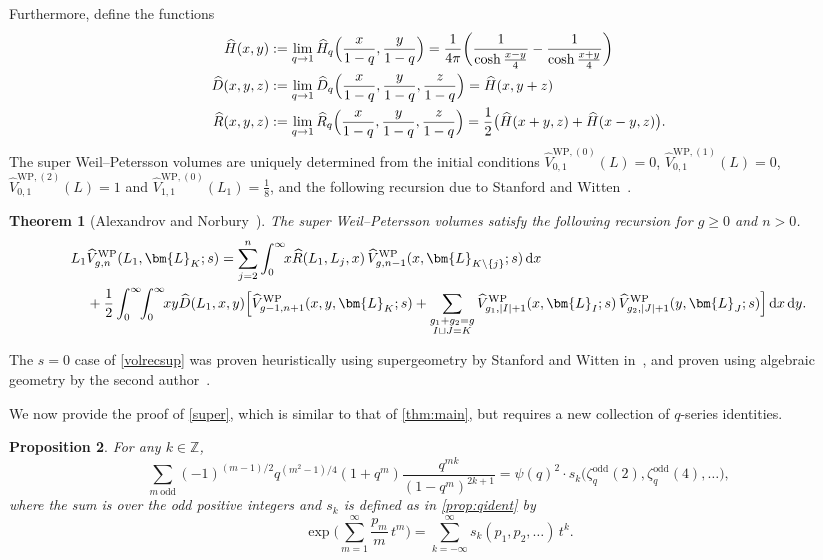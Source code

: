 \documentclass[a4paper]{article}
\theoremstyle{plain}
\newtheorem{theorem}{Theorem}
\newtheorem{proposition}[theorem]{Proposition}
\theoremstyle{definition}
\newcommand{\dd}{\mathrm{d}}
\renewcommand{\geq}{\geqslant}
\newcommand{\LL}{\bm{L}}
\newcommand{\bz}{\mathbb{Z}}
\begin{document}
Furthermore, define the functions
\begin{align} \label{qkerlimsup}
\widehat{H}(x,y)&:= \lim_{q\to 1} \widehat{H}_q \Big( \frac{x}{1-q}, \frac{y}{1-q} \Big) = \frac{1}{4\pi} \bigg( \frac{1}{\cosh\frac{x-y}{4}}-\frac{1}{\cosh\frac{x+y}{4}} \bigg) \notag\\
\widehat{D}(x,y,z)&:= \lim_{q\to 1} \widehat{D}_q \Big( \frac{x}{1-q}, \frac{y}{1-q}, \frac{z}{1-q} \Big) = \widehat{H}(x,y+z) \\
\widehat{R}(x,y,z)&:= \lim_{q\to 1} \widehat{R}_q \Big( \frac{x}{1-q}, \frac{y}{1-q}, \frac{z}{1-q} \Big) = \frac{1}{2} \big( \widehat{H}(x+y,z) + \widehat{H}(x-y,z) \big). \notag
\end{align}
The super Weil--Petersson volumes are uniquely determined from the initial conditions $\widehat{V}^{\mathrm{WP},(0)}_{0,1}(L) = 0$, $\widehat{V}^{\mathrm{WP},(1)}_{0,1}(L) = 0$, $\widehat{V}^{\mathrm{WP},(2)}_{0,1}(L) = 1$ and $\widehat{V}^{\mathrm{WP},(0)}_{1,1}(L_1)=\frac{1}{8}$, and the following recursion due to Stanford and Witten~\cite{SWiJTG}. 


\begin{theorem}[Alexandrov and Norbury~\cite{ANoSup}]
The super Weil--Petersson volumes satisfy the following recursion for $g\geq 0$ and $n>0$.
\begin{align} 
L_1&\widehat{V}^{\mathrm{WP}}_{g,n}(L_1, \LL_K;s)=\sum_{j=2}^n\int_0^\infty \!\! x \widehat{R}(L_1,L_j,x) \, \widehat{V}^{\mathrm{WP}}_{g,n-1}(x,\LL_{K \setminus \{j\}};s) \, \dd x \notag \\
&+ \frac{1}{2} \int_0^\infty \!\! \int_0^\infty \!\! xy \widehat{D}(L_1, x, y) \Big[\widehat{V}^{\mathrm{WP}}_{g-1,n+1}(x, y, \LL_K;s) + \sum_{\substack{g_1+g_2=g \\ I \sqcup J = K}} \widehat{V}^{\mathrm{WP}}_{g_1,|I|+1}(x, \LL_I;s) \, \widehat{V}^{\mathrm{WP}}_{g_2,|J|+1}(y, \LL_J;s) \Big] \, \dd x \, \dd y. \label{volrecsup}
\end{align}
\end{theorem} 


The $s=0$ case of \cref{volrecsup} was proven heuristically using supergeometry by Stanford and Witten in~\cite{SWiJTG}, and proven using algebraic geometry by the second author~\cite{NorEnu}.


We now provide the proof of \cref{super}, which is similar to that of \cref{thm:main}, but requires a new collection of $q$-series identities.


\begin{proposition} \label{prop:qidentodd}
For any $k\in\bz$,
\begin{equation} \label{qidentodd}
\sum_{m~\mathrm{odd}}(-1)^{(m-1)/2} q^{(m^2-1)/4} (1+q^m)\frac{q^{mk}}{(1-q^m)^{2k+1}}= \psi(q)^2\cdot s_k \big( \zeta^{\mathrm{odd}}_q(2), \zeta^{\mathrm{odd}}_q(4), \ldots \big),
\end{equation}
where the sum is over the odd positive integers and $s_k$ is defined as in \cref{prop:qident} by
\[
\exp \bigg(\sum_{m=1}^\infty \frac{p_m}{m} \, t^m \bigg) = \sum_{k=-\infty}^\infty s_k(p_1, p_2, \ldots) \, t^k.
\]
\end{proposition}
\end{document}
